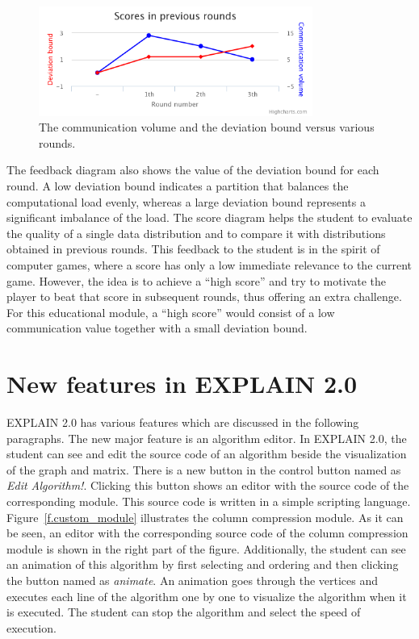 \documentclass[12pt, twoside,a4paper,toc=bibliography]{scrbook}
\begin{document}
\begin{figure}
\centering
\includegraphics[width=0.8\textwidth]{chart}
\caption{The communication volume and the deviation bound versus various rounds.}
\label{f.score}
\end{figure}
The feedback diagram also shows the value of the deviation bound for each round.
A low deviation bound
indicates a partition that balances the computational load evenly, whereas a large
deviation bound represents a significant imbalance of the load. The score diagram helps the
student to evaluate the quality of a single data distribution and to compare it with
distributions obtained in previous rounds. This feedback to the student is in
the spirit of computer games, where a score has only a low immediate relevance to the
current game. However, the idea is to achieve a ``high score'' and try to motivate the
player to beat that score in subsequent rounds, thus offering an extra challenge. For
this educational module, a ``high score'' would consist of a low communication value
together with a small deviation bound.

\section{New features in EXPLAIN 2.0}
\label{s.alg.edit}
EXPLAIN 2.0 has various features which are
discussed in the following paragraphs.
The new major feature is an algorithm editor.
In EXPLAIN 2.0, the student can see and edit the source code of an algorithm
beside the visualization of the graph and matrix.
There is a new button in the control button named as \textit{Edit Algorithm!}.
Clicking this button shows an editor with the source code of the corresponding module.
This source code is written in a simple scripting language.
Figure~\ref{f.custom_module} illustrates the column compression module.
As it can be seen, an editor with the corresponding source code of
the column compression module is shown in the right part of the figure.
Additionally, the student can see an animation of this algorithm
by first selecting and ordering and then clicking the button
named as \textit{animate}.
An animation goes through the vertices and executes each line of the algorithm
one by one to visualize the algorithm when it is executed.
The student can stop the algorithm and select the speed of execution.
\end{document}
